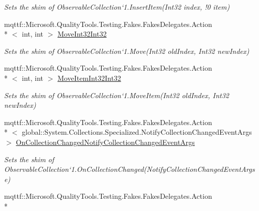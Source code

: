 \begin{DoxyCompactItemize}
\begin{DoxyCompactList}\small\item\em Sets the shim of Observable\-Collection`1.Insert\-Item(Int32 index, !0 item)\end{DoxyCompactList}\item 
mqttf\-::\-Microsoft.\-Quality\-Tools.\-Testing.\-Fakes.\-Fakes\-Delegates.\-Action\\*
$<$ int, int $>$ \hyperlink{class_system_1_1_collections_1_1_object_model_1_1_fakes_1_1_shim_observable_collection_3_01_t_01_4_af41cc5dbebf1e5155380945f91a09654}{Move\-Int32\-Int32}
\begin{DoxyCompactList}\small\item\em Sets the shim of Observable\-Collection`1.Move(\-Int32 old\-Index, Int32 new\-Index)\end{DoxyCompactList}\item 
mqttf\-::\-Microsoft.\-Quality\-Tools.\-Testing.\-Fakes.\-Fakes\-Delegates.\-Action\\*
$<$ int, int $>$ \hyperlink{class_system_1_1_collections_1_1_object_model_1_1_fakes_1_1_shim_observable_collection_3_01_t_01_4_ad7a098ba84a77df28a0e7c9a4b4fabb4}{Move\-Item\-Int32\-Int32}
\begin{DoxyCompactList}\small\item\em Sets the shim of Observable\-Collection`1.Move\-Item(\-Int32 old\-Index, Int32 new\-Index)\end{DoxyCompactList}\item 
mqttf\-::\-Microsoft.\-Quality\-Tools.\-Testing.\-Fakes.\-Fakes\-Delegates.\-Action\\*
$<$ global\-::\-System.\-Collections.\-Specialized.\-Notify\-Collection\-Changed\-Event\-Args $>$ \hyperlink{class_system_1_1_collections_1_1_object_model_1_1_fakes_1_1_shim_observable_collection_3_01_t_01_4_ab3db256037a3b071b425b35090a3c7f6}{On\-Collection\-Changed\-Notify\-Collection\-Changed\-Event\-Args}
\begin{DoxyCompactList}\small\item\em Sets the shim of Observable\-Collection`1.On\-Collection\-Changed(\-Notify\-Collection\-Changed\-Event\-Args e)\end{DoxyCompactList}\item 
mqttf\-::\-Microsoft.\-Quality\-Tools.\-Testing.\-Fakes.\-Fakes\-Delegates.\-Action\\*

\end{DoxyCompactItemize}
